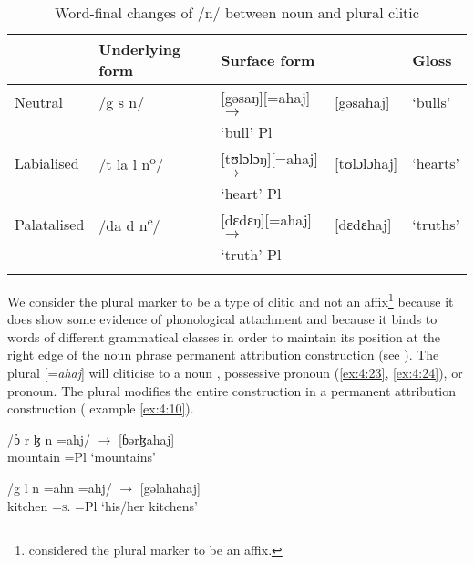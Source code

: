 \begin{table}
{\begin{tabular}{lllll}
\lsptoprule
& {Underlying form} & {Surface form} & &  {Gloss}\\\midrule
{Neutral } & /g s n/ & [gəsaŋ][=ahaj] \hspace{5pt}  $\rightarrow$  & [gəsahaj] & ‘bulls’\\
& & ‘bull’  \hspace{8pt}  Pl \\
{Labialised} & /t la l n\textsuperscript{o}/ & [tʊlɔlɔŋ][=ahaj] \hspace{3pt}  $\rightarrow$  & [tʊlɔlɔhaj] & ‘hearts’\\
& & ‘heart’ \hspace{8pt} Pl  \\
{Palatalised} & /da d n\textsuperscript{e}/ & [dɛdɛŋ][=ahaj] \hspace{5pt}  $\rightarrow$ & [dɛdɛhaj] & ‘truths’\\
& & ‘truth’ \hspace{5pt}  Pl \\
\lspbottomrule
\end{tabular}}
\caption{Word-final changes of /n/ between noun and plural clitic}\label{tab:28}
\end{table}

We consider the plural marker to be a type of clitic and not an affix\footnote{\citet{Bow1997c} considered the plural marker to be an affix. } because it does show some evidence of phonological attachment and because it binds to words of different grammatical classes in order to maintain its position at the right edge of the noun phrase permanent attribution construction (see ). The plural  [=\textit{ahaj}] will cliticise to a noun , possessive pronoun (\ref{ex:4:23}, \ref{ex:4:24}), or pronoun.  The plural modifies the entire construction in a permanent attribution construction ( example \ref{ex:4:10}). 

\ea \label{ex:4:22}
\textup{/ɓ r ɮ n \hspace{7pt} =ahj/     \hspace{36pt}   $\rightarrow$ \hspace{10pt}  [ɓərɮahaj]}\\
\glt  mountain     =Pl   \hspace{71pt}       ‘mountains’
\z

\ea \label{ex:4:23}
\textup{/g l n  \hspace{10pt}      =ahn    \hspace{12pt}      =ahj/  \hspace{3pt}  $\rightarrow$  \hspace{10pt} [gəlahahaj]}\\
\glt  kitchen  {}   =\textsc{s}.{\POSS}     =Pl  \hspace{38pt}    ‘his/her kitchens’
\z

